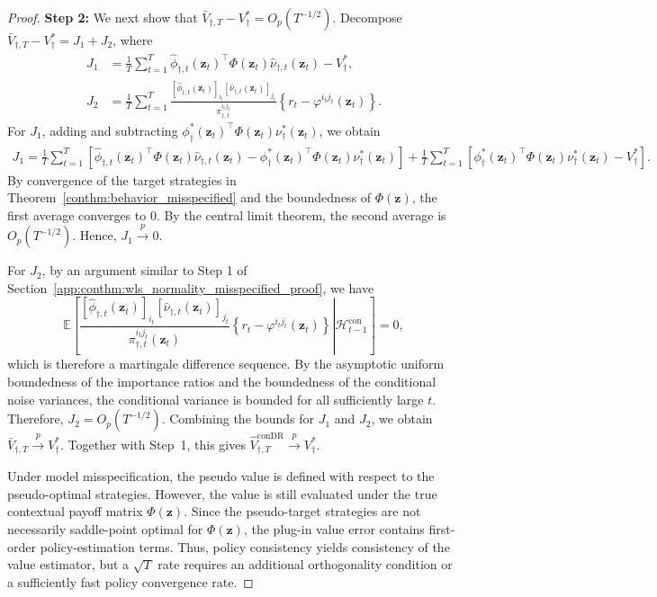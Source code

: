 \documentclass[12pt]{article}
\begin{document}
\begin{proof}
\textbf{Step 2:} We next show that $\bar V_{\dagger,T}-V_\dagger^\ast=O_p(T^{-1/2})$.
Decompose $\bar V_{\dagger,T}-V_\dagger^\ast=J_1+J_2$,
where
\begin{align*}
J_1
&=
\frac{1}{T}
\sum_{t=1}^T
\widehat{\phi}_{\dagger,t}(\bm z_t)^\top
\Phi(\bm z_t)
\widehat{\nu}_{\dagger,t}(\bm z_t)
-
V_\dagger^\ast,
\\
J_2
&=
\frac{1}{T}
\sum_{t=1}^T
\frac{
[\widehat{\phi}_{\dagger,t}(\bm z_t)]_{i_t}
[\widehat{\nu}_{\dagger,t}(\bm z_t)]_{j_t}}{\pi_{\dagger,t}^{i_tj_t}}
\left\{
r_t-\varphi^{i_tj_t}(\bm z_t)
\right\}.
\end{align*}
For $J_1$, adding and subtracting $\phi_\dagger^\ast(\bm z_t)^\top\Phi(\bm z_t)\nu_\dagger^\ast(\bm z_t)$,
we obtain
\begin{align*}
J_1=
\frac{1}{T}
\sum_{t=1}^T
\left[
\widehat{\phi}_{\dagger,t}(\bm z_t)^\top
\Phi(\bm z_t)
\widehat{\nu}_{\dagger,t}(\bm z_t)
-
\phi_\dagger^\ast(\bm z_t)^\top
\Phi(\bm z_t)
\nu_\dagger^\ast(\bm z_t)
\right]
+
\frac{1}{T}
\sum_{t=1}^T
\left[
\phi_\dagger^\ast(\bm z_t)^\top
\Phi(\bm z_t)
\nu_\dagger^\ast(\bm z_t)
-
V_\dagger^\ast
\right].
\end{align*}
By convergence of the target strategies in Theorem~\ref{conthm:behavior_misspecified} and the boundedness of $\Phi(\bm z)$, the first average converges to 0. By the central limit theorem, the second average is \(O_p(T^{-1/2})\). Hence, $J_1 \stackrel{p}{\to} 0$.

For \(J_2\), by an argument similar to Step 1 of Section~\ref{app:conthm:wls_normality_misspecified_proof}, we have
\[
\mathbb E
\left[
\left.
\frac{
[\widehat{\phi}_{\dagger,t}(\bm z_t)]_{i_t}
[\widehat{\nu}_{\dagger,t}(\bm z_t)]_{j_t}}{\pi_{\dagger,t}^{i_tj_t}(\bm z_t)}
\left\{
r_t-\varphi^{i_tj_t}(\bm z_t)
\right\}
\right\vert
\mathcal H_{t-1}^{\mathrm{con}}
\right]
=
0,
\]
which is therefore a martingale difference sequence. By the asymptotic uniform boundedness of the importance ratios and the boundedness of the conditional noise variances, the conditional variance is bounded for all sufficiently large $t$. Therefore, $J_2 = O_p(T^{-1/2})$.
Combining the bounds for $J_1$ and $J_2$, we obtain $\bar V_{\dagger,T} \stackrel{p}{\to} V_\dagger^\ast$. Together with Step~1, this gives $\widehat V_{\dagger,T}^{\mathrm{conDR}} \stackrel{p}{\to} V_\dagger^\ast$.

Under model misspecification, the pseudo value is defined with respect to the pseudo-optimal strategies. However, the value is still evaluated under the true contextual payoff matrix $\Phi(\bm z)$. Since the pseudo-target strategies are
not necessarily saddle-point optimal for $\Phi(\bm z)$, the plug-in value error contains first-order policy-estimation terms. Thus, policy consistency yields consistency of the value estimator, but a $\sqrt{T}$ rate requires an additional
orthogonality condition or a sufficiently fast policy convergence rate.
\end{proof}
\end{document}
